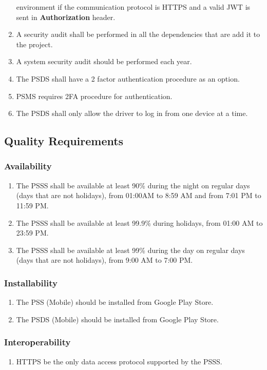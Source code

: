\begin{enumerate}[label=SEC-\arabic*]
    environment if the communication protocol is HTTPS and a 
    valid JWT \cite{jwt} is sent in \textbf{Authorization} header.
    \item A security audit shall be performed in all the dependencies that 
    are add it to the project.
    \item A system security audit should be performed each year.
    \item The PSDS shall have a 2 factor authentication procedure as an option.
    \item PSMS requires 2FA procedure for authentication.
    \item The PSDS shall only allow the driver to log in from one 
    device at a time.
\end{enumerate}
\pagebreak
\subsection{Quality Requirements}
\subsubsection{Availability}
\begin{enumerate}[label=AVL-\arabic*]
    \item The PSSS shall be available at least 90\% during 
    the night on regular days (days that are not holidays), from 
    01:00AM to 8:59 AM and from 7:01 PM to 11:59 PM.
    \item The PSSS shall be available at least 99.9\% during holidays, 
    from 01:00 AM to 23:59 PM.
    \item The PSSS shall be available at least 99\% during the day on regular 
    days (days that are not holidays), from 9:00 AM to 7:00 PM.
\end{enumerate}

\subsubsection{Installability}
\begin{enumerate}[label=INS-\arabic*]
    \item The PSS (Mobile) should be installed from Google Play Store.
    \item The PSDS (Mobile) should be installed from Google Play Store.
\end{enumerate}

\subsubsection{Interoperability}
\begin{enumerate}[label=IOP-\arabic*]
    \item HTTPS be the only data access protocol supported by the PSSS.
\end{enumerate}

